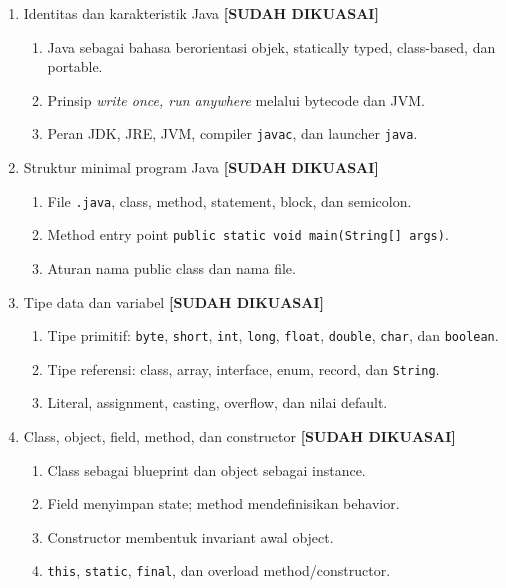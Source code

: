\begin{enumerate}
    \item Identitas dan karakteristik Java \textbf{[SUDAH DIKUASAI]}
    \begin{enumerate}
        \item Java sebagai bahasa berorientasi objek, statically typed, class-based, dan portable.
        \item Prinsip \textit{write once, run anywhere} melalui bytecode dan JVM.
        \item Peran JDK, JRE, JVM, compiler \texttt{javac}, dan launcher \texttt{java}.
    \end{enumerate}
    \item Struktur minimal program Java \textbf{[SUDAH DIKUASAI]}
    \begin{enumerate}
        \item File \texttt{.java}, class, method, statement, block, dan semicolon.
        \item Method entry point \texttt{public static void main(String[] args)}.
        \item Aturan nama public class dan nama file.
    \end{enumerate}
    \item Tipe data dan variabel \textbf{[SUDAH DIKUASAI]}
    \begin{enumerate}
        \item Tipe primitif: \texttt{byte}, \texttt{short}, \texttt{int}, \texttt{long}, \texttt{float}, \texttt{double}, \texttt{char}, dan \texttt{boolean}.
        \item Tipe referensi: class, array, interface, enum, record, dan \texttt{String}.
        \item Literal, assignment, casting, overflow, dan nilai default.
    \end{enumerate}
    \item Class, object, field, method, dan constructor \textbf{[SUDAH DIKUASAI]}
    \begin{enumerate}
        \item Class sebagai blueprint dan object sebagai instance.
        \item Field menyimpan state; method mendefinisikan behavior.
        \item Constructor membentuk invariant awal object.
        \item \texttt{this}, \texttt{static}, \texttt{final}, dan overload method/constructor.
    \end{enumerate}

\end{enumerate}
